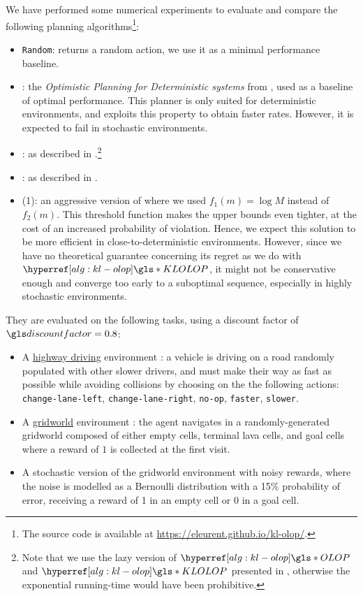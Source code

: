 We have performed some numerical experiments to evaluate and compare the following planning algorithms\footnote[1]{The source code is available at \href{https://eleurent.github.io/kl-olop/}{https://eleurent.github.io/kl-olop/}.}:
\begin{itemize}
	\item \texttt{Random}: returns a random action, we use it as a minimal performance baseline.
	\item \OPD: the \emph{Optimistic Planning for Deterministic systems} from \citep{Hren2008}, used as a baseline of optimal performance. This planner is only suited for deterministic environments, and exploits this property to obtain faster rates. However, it is expected to fail in stochastic environments.
	\item \OLOP: as described in .\footnote[2]{Note that we use the lazy version of $\OLOP$ and $\KLOLOP$ presented in , otherwise the exponential running-time would have been prohibitive.}
	\item \KLOLOP: as described in .\footnotemark[2]
	\item \KLOLOP(1): an aggressive version of \KLOLOP where we used $f_1(m) = \log M$ instead of $f_2(m)$. This threshold function makes the upper bounds even tighter, at the cost of an increased probability of violation. Hence, we expect this solution to be more efficient in close-to-deterministic environments. However, since we have no theoretical guarantee concerning its regret as we do with $\KLOLOP$, it might not be conservative enough and converge too early to a suboptimal sequence, especially in highly stochastic environments.
\end{itemize}

They are evaluated on the following tasks, using a discount factor of $\discount=0.8$:
\begin{itemize}
	\item A \href{https://github.com/eleurent/highway-env/}{highway driving} environment \citep{highway-env}: a vehicle is driving on a road randomly populated with other slower drivers, and must make their way as fast as possible while avoiding collisions by choosing on the the following actions: \texttt{change-lane-left}, \texttt{change-lane-right}, \texttt{no-op}, \texttt{faster}, \texttt{slower}.
	\item A \href{https://github.com/maximecb/gym-minigrid}{gridworld} environment \citep{gym_minigrid}: the agent navigates in a randomly-generated gridworld composed of either empty cells, terminal lava cells, and goal cells where a reward of $1$ is collected at the first visit.
	\item A stochastic version of the gridworld environment with noisy rewards, where the noise is modelled as a Bernoulli distribution with a 15\% probability of error, \ie receiving a reward of 1 in an empty cell or 0 in a goal cell.
\end{itemize}

